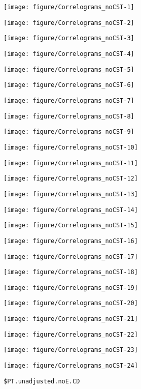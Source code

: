 \documentclass[preprint,authoryear,12pt]{elsarticle}\usepackage[]{graphicx}\usepackage[]{color}
\makeatletter
\def\maxwidth{ %
  \ifdim\Gin@nat@width>\linewidth
    \linewidth
  \else
    \Gin@nat@width
  \fi
}
\newenvironment{kframe}{%
 \def\at@end@of@kframe{}%
 \ifinner\ifhmode%
  \def\at@end@of@kframe{\end{minipage}}%
  \begin{minipage}{\columnwidth}%
 \fi\fi%
 \def\FrameCommand##1{\hskip\@totalleftmargin \hskip-\fboxsep
 \colorbox{shadecolor}{##1}\hskip-\fboxsep
     \hskip-\linewidth \hskip-\@totalleftmargin \hskip\columnwidth}%
 \MakeFramed {\advance\hsize-\width
   \@totalleftmargin\z@ \linewidth\hsize
   \@setminipage}}%
 {\par\unskip\endMakeFramed%
 \at@end@of@kframe}
\newenvironment{knitrout}{}{} %
\makeatother
\begin{document}
\begin{knitrout}
\color{fgcolor}
\texttt{[image: figure/Correlograms\_noCST-1]} 

\texttt{[image: figure/Correlograms\_noCST-2]} 

\texttt{[image: figure/Correlograms\_noCST-3]} 

\texttt{[image: figure/Correlograms\_noCST-4]} 

\texttt{[image: figure/Correlograms\_noCST-5]} 

\texttt{[image: figure/Correlograms\_noCST-6]} 

\texttt{[image: figure/Correlograms\_noCST-7]} 

\texttt{[image: figure/Correlograms\_noCST-8]} 

\texttt{[image: figure/Correlograms\_noCST-9]} 

\texttt{[image: figure/Correlograms\_noCST-10]} 

\texttt{[image: figure/Correlograms\_noCST-11]} 

\texttt{[image: figure/Correlograms\_noCST-12]} 

\texttt{[image: figure/Correlograms\_noCST-13]} 

\texttt{[image: figure/Correlograms\_noCST-14]} 

\texttt{[image: figure/Correlograms\_noCST-15]} 

\texttt{[image: figure/Correlograms\_noCST-16]} 

\texttt{[image: figure/Correlograms\_noCST-17]} 

\texttt{[image: figure/Correlograms\_noCST-18]} 

\texttt{[image: figure/Correlograms\_noCST-19]} 

\texttt{[image: figure/Correlograms\_noCST-20]} 

\texttt{[image: figure/Correlograms\_noCST-21]} 

\texttt{[image: figure/Correlograms\_noCST-22]} 

\texttt{[image: figure/Correlograms\_noCST-23]} 

\texttt{[image: figure/Correlograms\_noCST-24]} 
\begin{kframe}\begin{verbatim}
$PT.unadjusted.noE.CD


\end{verbatim}
\end{kframe}
\end{knitrout}
\end{document}
